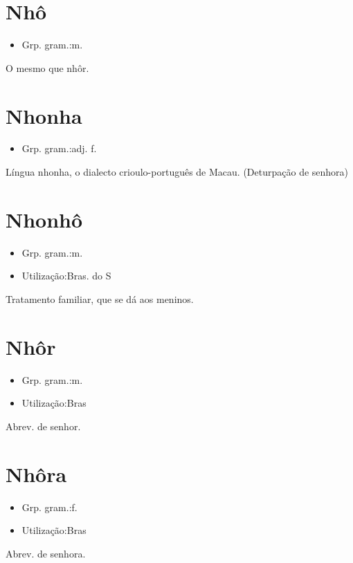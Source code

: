 \section{Nhô}
\begin{itemize}
\item {Grp. gram.:m.}
\end{itemize}
O mesmo que \textunderscore nhôr\textunderscore .
\section{Nhonha}
\begin{itemize}
\item {Grp. gram.:adj. f.}
\end{itemize}
\textunderscore Língua nhonha\textunderscore , o dialecto crioulo-português de Macau.
(Deturpação de \textunderscore senhora\textunderscore )
\section{Nhonhô}
\begin{itemize}
\item {Grp. gram.:m.}
\end{itemize}
\begin{itemize}
\item {Utilização:Bras. do S}
\end{itemize}
Tratamento familiar, que se dá aos meninos.
\section{Nhôr}
\begin{itemize}
\item {Grp. gram.:m.}
\end{itemize}
\begin{itemize}
\item {Utilização:Bras}
\end{itemize}
Abrev. de \textunderscore senhor\textunderscore .
\section{Nhôra}
\begin{itemize}
\item {Grp. gram.:f.}
\end{itemize}
\begin{itemize}
\item {Utilização:Bras}
\end{itemize}
Abrev. de \textunderscore senhora\textunderscore .
